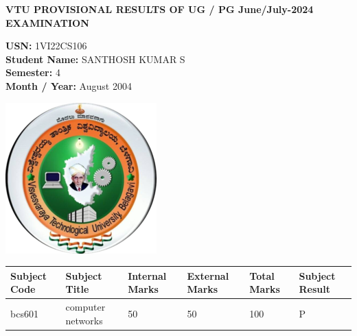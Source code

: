 \documentclass[a4paper,12pt]{article}
\begin{document}
\begin{center}
    \textbf{VTU PROVISIONAL RESULTS OF UG / PG June/July-2024 EXAMINATION}
\end{center}

\vspace{0.5cm}
\noindent
\begin{minipage}{0.7\textwidth}
\textbf{USN:} 1VI22CS106 \\
\textbf{Student Name:} SANTHOSH KUMAR S\\
\textbf{Semester: } 4\\
\textbf{Month / Year: } August 2004
\end{minipage}
\begin{minipage}{0.2\textwidth}
    \includegraphics[width=\textwidth]{vtulogo.png}
\end{minipage}
\vspace{0.5cm}

\begin{center}
\begin{tabular}{|m{2cm}|m{7cm}|m{2cm}|m{2cm}|m{2cm}|m{2cm}|}
    \hline
    \textbf{Subject Code} & \textbf{Subject Title} & \textbf{Internal Marks} & \textbf{External Marks} & \textbf{Total Marks} & \textbf{Subject Result} \\
    \hline
    bcs601 & computer networks & 50 & 50 & 100 & P \\ \hline
    \end{tabular}
\end{center}
\end{document}
